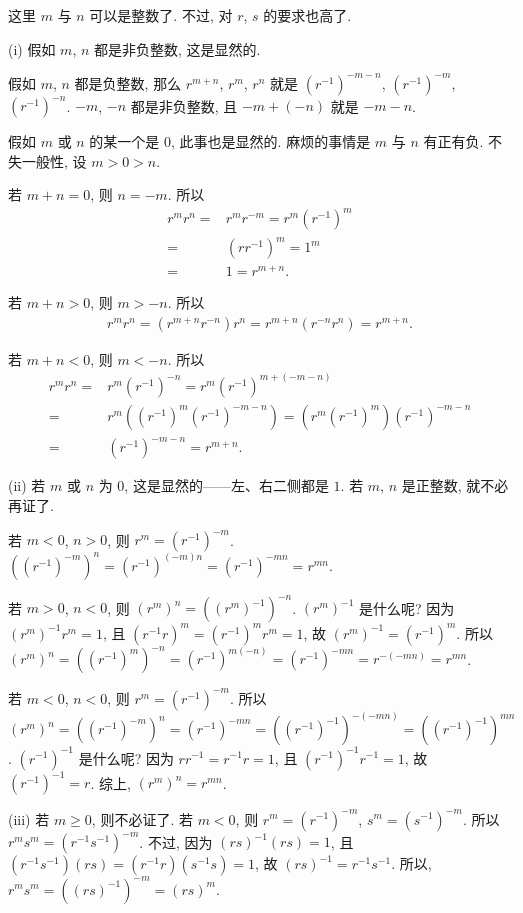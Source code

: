 \begin{pf}
    这里 $m$ 与 $n$ 可以是整数了. 不过, 对 $r$, $s$ 的要求也高了.

    (i) 假如 $m$, $n$ 都是非负整数, 这是显然的.

    假如 $m$, $n$ 都是负整数, 那么 $r^{m+n}$, $r^m$, $r^n$ 就是 $(r^{-1})^{-m-n}$, $(r^{-1})^{-m}$, $(r^{-1})^{-n}$. $-m$, $-n$ 都是非负整数, 且 $-m + (-n)$ 就是 $-m-n$.

    假如 $m$ 或 $n$ 的某一个是 $0$, 此事也是显然的. 麻烦的事情是 $m$ 与 $n$ 有正有负. 不失一般性, 设 $m > 0 > n$.

    若 $m + n = 0$, 则 $n = -m$. 所以
    \begin{align*}
        r^m r^n
        = {} & r^m r^{-m} = r^m (r^{-1})^m \\
        = {} & (rr^{-1})^m = 1^m           \\
        = {} & 1 = r^{m+n}.
    \end{align*}

    若 $m + n > 0$, 则 $m > -n$. 所以
    \begin{align*}
        r^m r^n = (r^{m+n} r^{-n}) r^n = r^{m+n} (r^{-n} r^n) = r^{m+n}.
    \end{align*}

    若 $m + n < 0$, 则 $m < -n$. 所以
    \begin{align*}
        r^m r^n
        = {} & r^m (r^{-1})^{-n} = r^m (r^{-1})^{m + (-m - n)}                         \\
        = {} & r^m ((r^{-1})^m (r^{-1})^{-m - n}) = (r^m (r^{-1})^m) (r^{-1})^{-m - n} \\
        = {} & (r^{-1})^{-m - n} = r^{m+n}.
    \end{align*}

    (ii) 若 $m$ 或 $n$ 为 $0$, 这是显然的——左、右二侧都是 $1$. 若 $m$, $n$ 是正整数, 就不必再证了.

    若 $m < 0$, $n > 0$, 则 $r^m = (r^{-1})^{-m}$. $((r^{-1})^{-m})^n = (r^{-1})^{(-m)n} = (r^{-1})^{-mn} = r^{mn}$.

    若 $m > 0$, $n < 0$, 则 $(r^m)^n = ((r^m)^{-1})^{-n}$. $(r^m)^{-1}$ 是什么呢? 因为 $(r^m)^{-1} r^m = 1$, 且 $(r^{-1} r)^m = (r^{-1})^m r^m = 1$, 故 $(r^m)^{-1} = (r^{-1})^m$. 所以 $(r^m)^n = ((r^{-1})^m)^{-n} = (r^{-1})^{m(-n)} = (r^{-1})^{-mn} = r^{-(-mn)} = r^{mn}$.

    若 $m < 0$, $n < 0$, 则 $r^m = (r^{-1})^{-m}$. 所以 $(r^m)^n = ((r^{-1})^{-m})^n = (r^{-1})^{-mn} = ((r^{-1})^{-1})^{-(-mn)} = ((r^{-1})^{-1})^{mn}$. $(r^{-1})^{-1}$ 是什么呢? 因为 $r r^{-1} = r^{-1} r = 1$, 且 $(r^{-1})^{-1} r^{-1} = 1$, 故 $(r^{-1})^{-1} = r$. 综上, $(r^m)^n = r^{mn}$.

    (iii) 若 $m \geq 0$, 则不必证了. 若 $m < 0$, 则 $r^m = (r^{-1})^{-m}$, $s^m = (s^{-1})^{-m}$. 所以 $r^m s^m = (r^{-1} s^{-1})^{-m}$. 不过, 因为 $(rs)^{-1} (rs) = 1$, 且 $(r^{-1} s^{-1}) (rs) = (r^{-1} r) (s^{-1} s) = 1$, 故 $(rs)^{-1} = r^{-1} s^{-1}$. 所以, $r^m s^m = ((rs)^{-1})^{-m} = (rs)^m$.
\end{pf}

